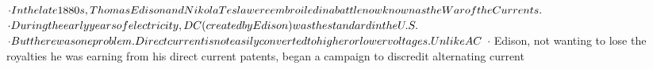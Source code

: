 \documentclass[preview]{standalone}
\begin{document}
\centering $\cdot In the late 1880s, Thomas Edison and Nikola Tesla were embroiled in a battle now known as the War of the Currents.\newline$ $\cdot During the early years of electricity, DC (created by Edison) was the standard in the U.S.\newline$ $\cdot But there was one problem. Direct current is not easily converted to higher or lower voltages. Unlike AC\newline$ $\cdot$ Edison, not wanting to lose the royalties he was earning from his direct current patents, began a campaign to discredit alternating current
\end{document}
